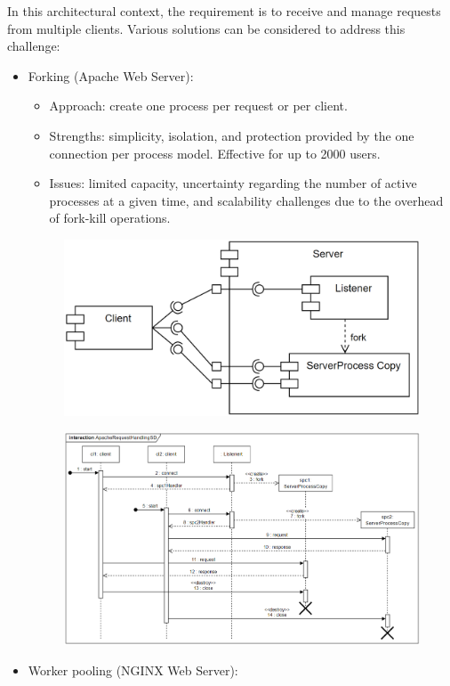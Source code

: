 In this architectural context, the requirement is to receive and manage requests from multiple clients. 
Various solutions can be considered to address this challenge:
\begin{itemize}
    \item Forking (Apache Web Server): 
        \begin{itemize}
            \item Approach: create one process per request or per client.
            \item Strengths: simplicity, isolation, and protection provided by the one connection per process model. 
                Effective for up to 2000 users.
            \item Issues: limited capacity, uncertainty regarding the number of active processes at a given time, and scalability challenges due to the overhead of fork-kill operations.
        \end{itemize}
        \begin{figure}[H]
            \centering
            \includegraphics[width=0.5\linewidth]{images/fork.png}
        \end{figure}
        \begin{figure}[H]
            \centering
            \includegraphics[width=0.9\linewidth]{images/fork1.png}
        \end{figure}
    \item Worker pooling (NGINX Web Server): 
        \begin{itemize}

\end{itemize}
\end{itemize}

